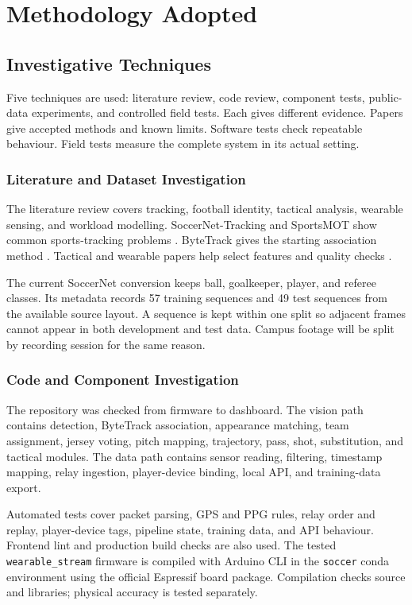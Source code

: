 \section{Methodology Adopted}

\subsection{Investigative Techniques}
Five techniques are used: literature review, code review, component tests,
public-data experiments, and controlled field tests. Each gives different
evidence. Papers give accepted methods and known limits. Software tests check
repeatable behaviour. Field tests measure the complete system in its actual
setting.

\subsubsection{Literature and Dataset Investigation}
The literature review covers tracking, football identity, tactical analysis,
wearable sensing, and workload modelling. SoccerNet-Tracking and SportsMOT show
common sports-tracking problems \cite{cioppa2022soccernet,cui2023sportsmot}.
ByteTrack gives the starting association method \cite{zhang2022bytetrack}.
Tactical and wearable papers help select features and quality checks
\cite{honda2022pass,teixeira2025tactical,charlton2022ppg}.

The current SoccerNet conversion keeps ball, goalkeeper, player, and referee
classes. Its metadata records 57 training sequences and 49 test sequences from
the available source layout. A sequence is kept within one split so adjacent
frames cannot appear in both development and test data. Campus footage will be
split by recording session for the same reason.

\subsubsection{Code and Component Investigation}
The repository was checked from firmware to dashboard. The vision path contains
detection, ByteTrack association, appearance matching, team assignment, jersey
voting, pitch mapping, trajectory, pass, shot, substitution, and tactical
modules. The data path contains sensor reading, filtering, timestamp mapping,
relay ingestion, player-device binding, local API, and training-data export.

Automated tests cover packet parsing, GPS and PPG rules, relay order and replay,
player-device tags, pipeline state, training data, and API behaviour. Frontend
lint and production build checks are also used. The tested
\texttt{wearable\_stream} firmware is compiled with Arduino CLI in the
\texttt{soccer} conda environment using the official Espressif board package.
Compilation checks source and libraries;
physical accuracy is tested separately.

